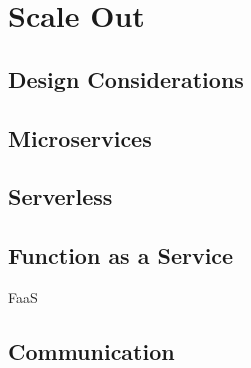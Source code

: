 \chapter{Scale Out}

\section{Design Considerations} 

\section{Microservices}

\section{Serverless}

\section{Function as a Service}
\begin{definitionbox}{FaaS}
    
\end{definitionbox}

\section{Communication}

